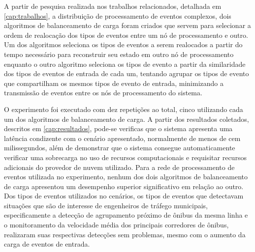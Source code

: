 A partir de pesquisa realizada nos trabalhos relacionados, detalhada em \autoref{cap:trabalhos}, a distribuição de processamento de eventos complexos, dois algoritmos de balanceamento de carga foram criados que servem para selecionar a ordem de realocação dos tipos de eventos entre um nó de processamento e outro. Um dos algoritmos seleciona os tipos de eventos a serem realocados a partir do tempo necessário para reconstruir seu estado em outro nó de processamento enquanto o outro algoritmo seleciona os tipos de evento a partir da similaridade dos tipos de eventos de entrada de cada um, tentando agrupar os tipos de evento que compartilham os mesmos tipos de evento de entrada, minimizando a transmissão de eventos entre os nós de processamento do sistema.

O experimento foi executado com dez repetições ao total, cinco utilizando cada um dos algoritmos de balanceamento de carga. A partir dos resultados coletados, descritos em \autoref{cap:resultados}, pode-se verificas que o sistema apresenta uma latência condizente com o cenário apresentado, normalmente de menos de cem milissegundos, além de demonstrar que o sistema consegue automaticamente verificar uma sobrecarga no uso de recursos computacionais e requisitar recursos adicionais do provedor de nuvem utilizado. Para a rede de processamento de eventos utilizada no experimento, nenhum dos dois algoritmos de balanceamento de carga apresentou um desempenho superior significativo em relação ao outro. Dos tipos de eventos utilizados no cenários, os tipos de eventos que detectavam situações que são de interesse de engenheiros de tráfego municipais, especificamente a detecção de agrupamento próximo de ônibus da mesma linha e o monitoramento da velocidade média dos principais corredores de ônibus, realizaram suas respectivas detecções sem problemas, mesmo com o aumento da carga de eventos de entrada.
















